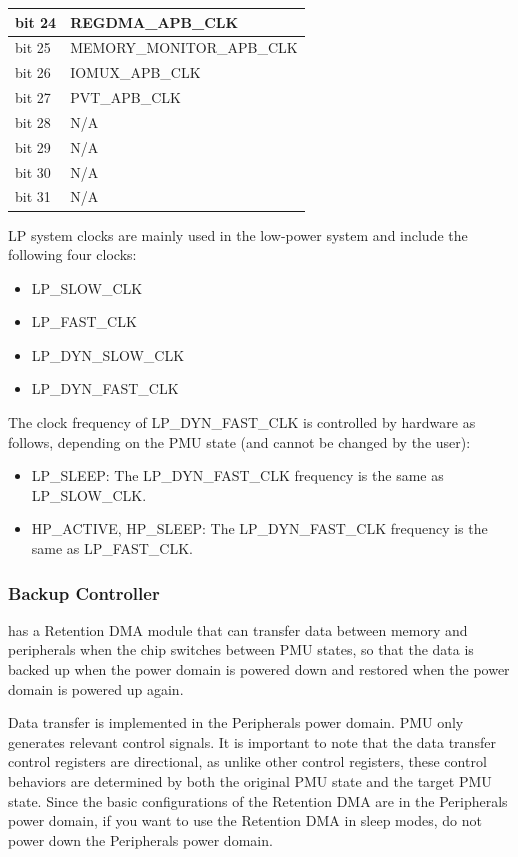 \documentclass[main\_\_EN.tex]{subfiles}
\begin{document}
\begin{itemize}
\begin{itemize}
\begin{longtable}[c]{|l|l|}
    bit 24 & REGDMA\_APB\_CLK\\\hline
    bit 25 & MEMORY\_MONITOR\_APB\_CLK\\\hline
    bit 26 & IOMUX\_APB\_CLK\\\hline
    bit 27 & PVT\_APB\_CLK\\\hline
    bit 28 & N/A\\\hline
    bit 29 & N/A\\\hline
    bit 30 & N/A\\\hline
    bit 31 & N/A\\\hline
\end{longtable}

    \end{itemize}

\end{itemize}

LP system clocks are mainly used in the low-power system and include the following four clocks:

    \begin{itemize}
    \item LP\_SLOW\_CLK
    \item LP\_FAST\_CLK
    \item LP\_DYN\_SLOW\_CLK
    \item LP\_DYN\_FAST\_CLK
    \end{itemize}

The clock frequency of LP\_DYN\_FAST\_CLK is controlled by hardware as follows, depending on the PMU state (and cannot be changed by the user):

    \begin{itemize}
    \item LP\_SLEEP: The LP\_DYN\_FAST\_CLK frequency is the same as LP\_SLOW\_CLK.
    \item HP\_ACTIVE, HP\_SLEEP: The LP\_DYN\_FAST\_CLK frequency is the same as LP\_FAST\_CLK.
    \end{itemize}

\subsubsection{Backup Controller}

\chipname{} has a Retention DMA module that can transfer data between memory and peripherals when the chip switches between PMU states, so that the data is backed up when the power domain is powered down and restored when the power domain is powered up again.

Data transfer is implemented in the Peripherals power domain. PMU only generates relevant control signals. It is important to note that the data transfer control registers are directional, as unlike other control registers, these control behaviors are determined by both the original PMU state and the target PMU state. Since the basic configurations of the Retention DMA are in the Peripherals power domain, if you want to use the Retention DMA in sleep modes, do not power down the Peripherals power domain.
\end{document}
